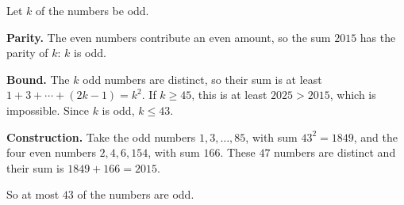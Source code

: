 Let $k$ of the numbers be odd.

\textbf{Parity.} The even numbers contribute an even amount, so the sum $2015$ has the parity of $k$: $k$ is odd.

\textbf{Bound.} The $k$ odd numbers are distinct, so their sum is at least $1+3+\cdots+(2k-1)=k^2$. If $k\ge45$, this is at least $2025>2015$, which is impossible. Since $k$ is odd, $k\le43$.

\textbf{Construction.} Take the odd numbers $1,3,\dots,85$, with sum $43^2=1849$, and the four even numbers $2,4,6,154$, with sum $166$. These $47$ numbers are distinct and their sum is $1849+166=2015$.

So at most $\boxed{43}$ of the numbers are odd.
